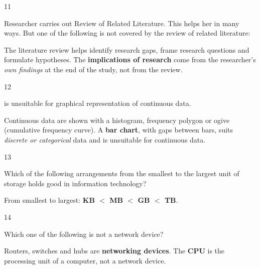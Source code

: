 \begin{question}{11}
{Researcher carries out Review of Related Literature. This helps her in many ways. But one of the following is not covered by the review of related literature:\par}
\begin{explain}
The literature review helps identify research gaps, frame research questions and formulate hypotheses. The \textbf{implications of research} come from the researcher's \emph{own findings} at the end of the study, not from the review.
\end{explain}
\end{question}

\begin{question}{12}
{\blank{} is unsuitable for graphical representation of continuous data.\par}
\begin{explain}
Continuous data are shown with a histogram, frequency polygon or ogive (cumulative frequency curve). A \textbf{bar chart}, with gaps between bars, suits \emph{discrete or categorical} data and is unsuitable for continuous data.
\end{explain}
\end{question}

\begin{question}{13}
{Which of the following arrangements from the smallest to the largest unit of storage holds good in information technology?\par}
\begin{explain}
From smallest to largest: \textbf{KB $<$ MB $<$ GB $<$ TB}.
\end{explain}
\end{question}

\begin{question}{14}
{Which one of the following is not a network device?\par}
\begin{explain}
Routers, switches and hubs are \textbf{networking devices}. The \textbf{CPU} is the processing unit of a computer, not a network device.
\end{explain}
\end{question}

